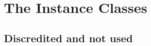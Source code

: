 \documentclass{beamer}
\newcommand{\currentsection}{}
\newcommand{\mysection}[1]{\renewcommand{\currentsection}{#1}\section{#1}}
\begin{document}
\mysection{The Instance Classes}


\subsection{Discredited and not used}
\end{document}

